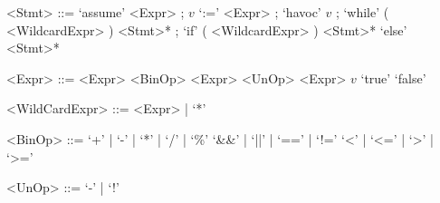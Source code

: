 
\begin{grammar}
	<Stmt> ::= `assume' <Expr> ;
	\alt $v$ `:=' <Expr> ;
	\alt `havoc' $v$ ;
	\alt `while' ( <WildcardExpr> ) <Stmt>* ;
	\alt `if' ( <WildcardExpr> ) <Stmt>* `else' <Stmt>*
	
	<Expr> ::= <Expr> <BinOp> <Expr>
	\alt <UnOp> <Expr>
	\alt $v$
	\alt `true'
	\alt `false'
	
	<WildCardExpr> ::= <Expr> | `*'
	
	<BinOp> ::= `+' | `-' | `*' | `/' | `\%'
	\alt `\&\&' | `||' | `==' | `!='
	\alt `<' | `<=' | `>' | `>='
	
	<UnOp> ::= `-' | `!'
\end{grammar}